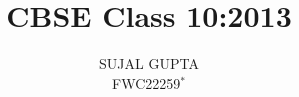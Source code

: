 \documentclass[journal,12pt,twocolumn]{IEEEtran}
\begin{document}
\let\StandardTheFigure\thefigure
\let\vec\mathbf
\renewcommand{\thefigure}{\theproblem}



\def\putbox#1#2#3{\makebox[0in][l]{\makebox[#1][l]{}\raisebox{\baselineskip}[0in][0in]{\raisebox{#2}[0in][0in]{#3}}}}
     \def\rightbox#1{\makebox[0in][r]{#1}}
     \def\centbox#1{\makebox[0in]{#1}}
     \def\topbox#1{\raisebox{-\baselineskip}[0in][0in]{#1}}
     \def\midbox#1{\raisebox{-0.5\baselineskip}[0in][0in]{#1}}

\vspace{3cm}

\title{
	CBSE Class 10:2013
}
\author{ SUJAL GUPTA\\FWC22259$^{*}$%
	
	
}	


%
%
%

% 
%
\end{document}
